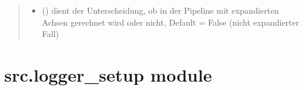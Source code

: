 \documentclass[a4paper,10pt,ngerman]{sphinxmanual}
\begin{document}
\begin{fulllineitems}
\begin{quote}
\begin{description}
\begin{itemize}
\item {} 
\sphinxAtStartPar
{} () \textendash{} dient der Unterscheidung, ob in der Pipeline mit expandierten Achsen gerechnet wird oder nicht, Default = False (nicht expandierter Fall)

\end{itemize}

\sphinxAtStartPar
{}

\end{description}\end{quote}

\end{fulllineitems}



\section{src.logger\_setup module}
\label{\detokenize{api:module-src.logger_setup}}\label{\detokenize{api:src-logger-setup-module}}

\begin{fulllineitems}
\label{\detokenize{api:src.logger_setup.log}}
\pysigstartsignatures
\pysiglinewithargsret
{}
{\sphinxparamcomma {}}
{}
\pysigstopsignatures
\end{fulllineitems}

\end{document}
